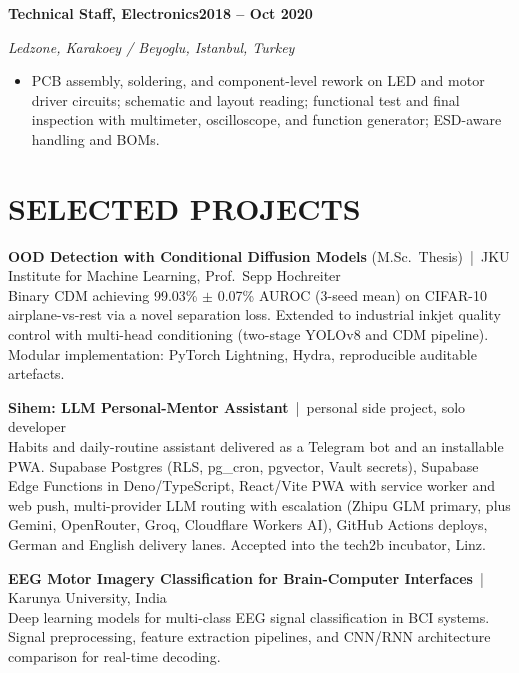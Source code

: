 \documentclass[11pt,a4paper]{article}
\newcommand{\role}[2]{%
  \noindent\textbf{#1}\hfill\textbf{\color{midgray}#2}\par%
}
\newcommand{\org}[1]{\noindent\textit{#1}\par\vspace{1pt}}
\begin{document}
\role{Technical Staff, Electronics}{2018 -- Oct 2020}
\org{Ledzone, Karakoey / Beyoglu, Istanbul, Turkey}
\begin{itemize}
  \item PCB assembly, soldering, and component-level rework on LED and motor driver circuits; schematic and layout reading; functional test and final inspection with multimeter, oscilloscope, and function generator; ESD-aware handling and BOMs.
\end{itemize}

\section*{SELECTED PROJECTS}

\textbf{OOD Detection with Conditional Diffusion Models} (M.Sc.\ Thesis) \,|\, JKU Institute for Machine Learning, Prof.\ Sepp Hochreiter\\
Binary CDM achieving 99.03\% $\pm$ 0.07\% AUROC (3-seed mean) on CIFAR-10 airplane-vs-rest via a novel separation loss. Extended to industrial inkjet quality control with multi-head conditioning (two-stage YOLOv8 and CDM pipeline). Modular implementation: PyTorch Lightning, Hydra, reproducible auditable artefacts.
\vspace{1pt}

\textbf{Sihem: LLM Personal-Mentor Assistant} \,|\, personal side project, solo developer\\
Habits and daily-routine assistant delivered as a Telegram bot and an installable PWA. Supabase Postgres (RLS, pg\_cron, pgvector, Vault secrets), Supabase Edge Functions in Deno/TypeScript, React/Vite PWA with service worker and web push, multi-provider LLM routing with escalation (Zhipu GLM primary, plus Gemini, OpenRouter, Groq, Cloudflare Workers AI), GitHub Actions deploys, German and English delivery lanes. Accepted into the tech2b incubator, Linz.
\vspace{1pt}

\textbf{EEG Motor Imagery Classification for Brain-Computer Interfaces} \,|\, Karunya University, India\\
Deep learning models for multi-class EEG signal classification in BCI systems. Signal preprocessing, feature extraction pipelines, and CNN/RNN architecture comparison for real-time decoding.
\end{document}
